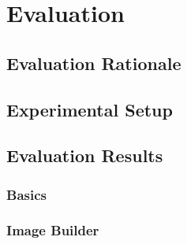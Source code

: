 
\chapter{Evaluation}\label{chapter:evaluation}

\section{Evaluation Rationale}

\section{Experimental Setup}

\section{Evaluation Results}

\subsection{Basics}

\subsection{Image Builder}


